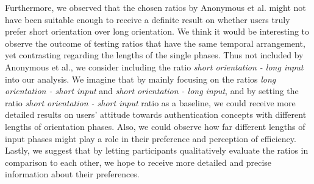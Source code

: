 Furthermore, we observed that the chosen ratios by Anonymous et al. \cite{anonymous} might not have been suitable enough to receive a definite result on whether users truly prefer short orientation over long orientation. We think it would be interesting to observe the outcome of testing ratios that have the same temporal arrangement, yet contrasting regarding the lengths of the single phases. Thus not included by Anonymous et al., we consider including the ratio \textit{short orientation - long input} into our analysis. We imagine that by mainly focusing on the ratios \textit{long orientation - short input} and \textit{short orientation - long input}, and by setting the ratio \textit{short orientation - short input} ratio as a baseline, we could receive more detailed results on users' attitude towards authentication concepts with different lengths of orientation phases. Also, we could observe how far different lengths of input phases might play a role in their preference and perception of efficiency. Lastly, we suggest that by letting participants qualitatively evaluate the ratios in comparison to each other, we hope to receive more detailed and precise information about their preferences.  




